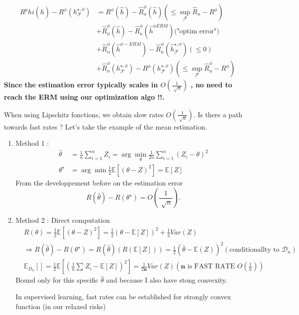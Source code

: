 \begin{align*}
    R^phi (\hat{h}) - R^\phi (h^{\star , \phi }_\mathcal{F}) &= R^\phi (\hat{h}) - \hat{R}^\phi_n(\hat{h}) (\leq  \sup _\mathcal{F} \hat{R}_n - R^\phi ) \\
        &+ \hat{R}^\phi _n (\hat{h}) - \hat{R}^\phi _n (\hat{h}^{\phi ERM}) \text{("optim error")} \\
        &+ \hat{R}^\phi _n (\hat{h}^{\phi-ERM}) - \hat{R}^\phi _n (\hat{h}^{\star , \phi } _\mathcal{F}) (\leq 0) \\
        &+ \hat{R}^\phi _n (h^{\star , \phi } _\mathcal{F}) - R^\phi (h^{\star , \phi } _ \mathcal{F}) (\leq \sup _\mathcal{F} \hat{R}^\phi _n - R^\phi )
\end{align*}
\textbf{Since the estimation error typically scales in $ O(\frac{1}{\sqrt[]{n}}) $ , no need to reach the ERM using our optimization algo !!.}

\begin{note}[]
    When using Lipschitz fonctions, we obtain slow rates $ O(\frac{1}{\sqrt[]{n}}) $. Is there a path towards fast rates ? Let's take the example of the mean estimation. 
    \begin{enumerate}
        \item Method 1 : \begin{align*}
            \hat{\theta } &= \frac{1}{n} \sum_{i=1}^{n} Z_i = \arg \min_\theta \frac{1}{2n} \sum_{i=1}^{n} (Z_i - \theta )^2  \\
            \theta ^\star &= \arg \min \frac{1}{2}\mathbb{E}[ (\theta - Z) ^2] = \mathbb{E}[Z]
        \end{align*}
        From the developpement before on the estimation error 
        \[
            R(\hat{\theta }) - R(\theta ^\star ) = O( \frac{1}{\sqrt[]{n}})
        .\]
        
        \item Method 2 : Direct computation \begin{align*}
            &R (\theta ) = \frac{1}{2}\mathbb{E}[(\theta  - Z)^2] = \frac{1}{2}(\theta - \mathbb{E}[Z])^2 + \frac{1}{2}Var(Z) \\
            &\Rightarrow R(\hat{\theta }) - R(\theta ^\star ) = R(\hat{\theta }) ( R(\mathbb{E}[Z])) = \frac{1}{2}(\hat{\theta } - \mathbb{E} (Z))^2 (\text{conditionallty to } \mathcal{D}_n)\\
            &\mathbb{E}_{D_n} [     ] = \frac{1}{2} \mathbb{E}[(\frac{1}{n} \sum_{}^{} Z_i - \mathbb{E}[Z])^2 ] = \frac{1}{2 \mathbf{n}} Var(Z) ( \mathbf{n} \text{ is FAST RATE } O(\frac{1}{n}))
        \end{align*}
        Bound only for this specific $ \hat{\theta } $ and because I also have stong convexity. 
        
        In supervised learning, fast rates can be established for strongly convex function (in our relaxed risks)
    \end{enumerate}
\end{note}

